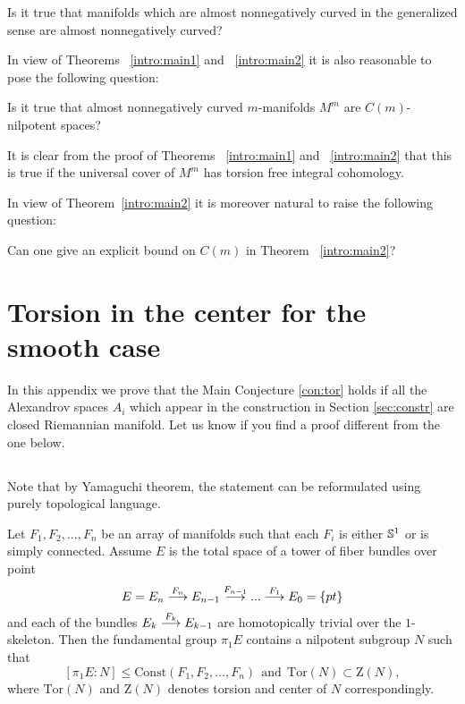 \documentclass{amsart}
\begin{document}
\begin{quest}
Is it true  that  manifolds which are almost nonnegatively curved in the generalized sense
are almost nonnegatively curved?
\end{quest}


In view of Theorems ~\ref{intro:main1} and ~\ref{intro:main2} it is
also reasonable to pose the following question:

\begin{quest}
Is it true that almost nonnegatively curved $m$-manifolds $M^m$
are $C(m)$-nilpotent spaces?
\end{quest}

It is clear from the proof of Theorems ~\ref{intro:main1} and ~\ref{intro:main2}
that this is true if the universal cover
of $M^m$ has torsion free integral cohomology.

In view of Theorem~\ref{intro:main2} it is moreover natural to raise
the following question:
\begin{quest}
Can one give an explicit bound on $C(m)$ in Theorem ~\ref{intro:main2}?
\end{quest}

\appendix
\section{Torsion in the center for the smooth case}

In this appendix we prove that the Main Conjecture \ref{con:tor} holds if all the Alexandrov spaces $A_i$ which appear in the construction in  Section \ref{sec:constr} are closed Riemannian manifold.
Let us know if you find a proof different from the one below. 


\subsection{}
Note that by Yamaguchi theorem, the statement can be reformulated using purely topological language.


\begin{thm}
Let $F_1,F_2,...,F_n$ be an array of manifolds 
such that each $F_i$ is either ${\Bbb S}^{1}$ or is simply connected. 
Assume $E$ is the total space of a tower of fiber bundles over point
$$E=E_n\buildrel {F_n}\over \longrightarrow E_{n-1}\buildrel {F_{n-1}}\over\longrightarrow...\buildrel {F_1}\over\longrightarrow E_0=\{pt\}$$
and each of the bundles $E_k\buildrel {F_k}\over \longrightarrow E_{k-1}$ are homotopically trivial over the $1$-skeleton. 
Then the fundamental group $\pi_1E$ contains a nilpotent subgroup $N$ such that
$$[\pi_1E:N]\le \mathrm{Const}(F_1,F_2,\dots,F_n)\ \ \text{and}\ \ \mathrm{Tor}(N)\subset \mathrm{Z}(N),$$
where $\mathrm{Tor}(N)$ and $\mathrm{Z}(N)$ denotes torsion and center of $N$ correspondingly.
\end{thm}
\end{document}
